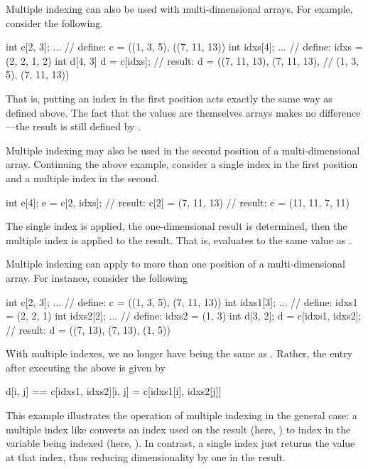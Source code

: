 Multiple indexing can also be used with multi-dimensional arrays.  For
example, consider the following.
%
\begin{stancode}
int c[2, 3];   
...            // define: c = ((1, 3, 5), ((7, 11, 13))
int idxs[4];
...            // define: idxs = (2, 2, 1, 2)
int d[4, 3]
d = c[idxs];  // result: d = ((7, 11, 13), (7, 11, 13),
               //              (1, 3, 5), (7, 11, 13))
\end{stancode}
%
That is, putting an index in the first position acts exactly the same
way as defined above.  The fact that the values are themselves arrays
makes no difference---the result is still defined by .

Multiple indexing may also be used in the second position of a
multi-dimensional array.  Continuing the above example, consider a
single index in the first position and a multiple index in the second.
%
\begin{stancode}
int e[4];
e = c[2, idxs];  // result:  c[2] = (7, 11, 13)
                  // result:  e = (11, 11, 7, 11)
\end{stancode}
%
The single index is applied, the one-dimensional result is determined,
then the multiple index is applied to the result.  That is,
 evaluates to the same value as . 

Multiple indexing can apply to more than one position of a
multi-dimensional array.  For instance, consider the following
%
\begin{stancode}
int c[2, 3];   
...                    // define: c = ((1, 3, 5), (7, 11, 13))
int idxs1[3];
...                    // define: idxs1 = (2, 2, 1)
int idxs2[2]; 
...                    // define: idxs2 = (1, 3)
int d[3, 2];
d = c[idxs1, idxs2];  // result: d = ((7, 13), (7, 13), (1, 5))
\end{stancode}
%
With multiple indexes, we no longer have  being
the same as .  Rather, the entry 
after executing the above is given by
%
\begin{stancode}
d[i, j] == c[idxs1, idxs2][i, j] = c[idxs1[i], idxs2[j]]
\end{stancode}
%
This example illustrates the operation of multiple indexing in the
general case: a multiple index like  converts an index
 used on the result (here, ) to index
 in the variable being indexed (here, ).  In
contrast, a single index just returns the value at that index, thus
reducing dimensionality by one in the result.

